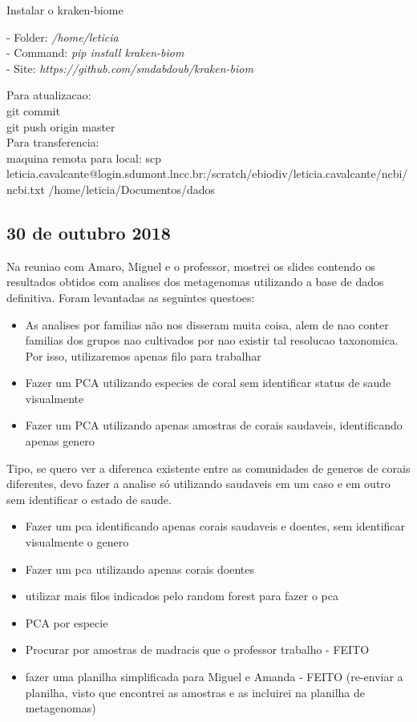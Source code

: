 \documentclass[12pt, a4paper]{report}
\begin{document}
Instalar o kraken-biome

\begin{tcolorbox}[width=6.5in]
- Folder: \textit{/home/leticia}\\
- Command: \textit{pip install kraken-biom}\\
- Site: \textit{https://github.com/smdabdoub/kraken-biom}
\end{tcolorbox}

Para atualizacao: \\
git commit \\
git push origin master \\

Para transferencia: \\
maquina remota para local:
scp leticia.cavalcante@login.sdumont.lncc.br:/scratch/ebiodiv/leticia.cavalcante/ncbi/ncbi.txt /home/leticia/Documentos/dados

\subsection{30 de outubro 2018}
Na reuniao com Amaro, Miguel e o professor, mostrei os slides contendo os resultados obtidos com analises dos metagenomas utilizando a base de dados definitiva. Foram levantadas as seguintes questoes:
\begin{itemize}
\item As analises por familias não nos disseram muita coisa, alem de nao conter familias dos grupos nao cultivados por nao existir tal resolucao taxonomica. Por isso, utilizaremos apenas filo para trabalhar
\item Fazer um PCA utilizando especies de coral sem identificar status de saude visualmente
\item Fazer um PCA utilizando apenas amostras de corais saudaveis, identificando apenas genero
\end{itemize}
Tipo, se quero ver a diferenca existente entre as comunidades de generos de corais diferentes, devo fazer a analise só utilizando saudaveis em um caso e em outro sem identificar o estado de saude.

\begin{itemize}
\item Fazer um pca identificando apenas corais saudaveis e doentes, sem identificar visualmente o genero 
\item Fazer um pca utilizando apenas corais doentes
\item utilizar mais filos indicados pelo random forest para fazer o pca
\item PCA por especie
\item Procurar por amostras de madracis que o professor trabalho - FEITO
\item fazer uma planilha simplificada para Miguel e Amanda - FEITO (re-enviar a planilha, visto que encontrei as amostras e as incluirei na planilha de metagenomas)
\end{itemize}



 
 



 
\end{document}
